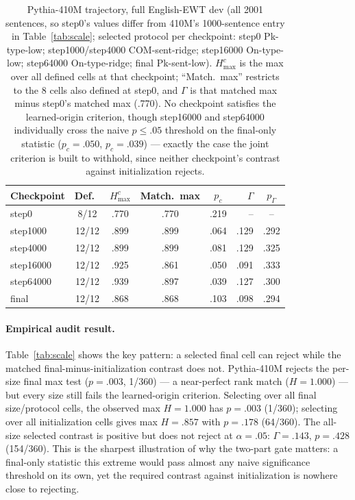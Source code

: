 \documentclass[11pt]{article}
\begin{document}
\begin{table}[t]
\centering\scriptsize
\setlength{\tabcolsep}{2pt}
\begin{tabular}{lccccrc}
\toprule
Checkpoint & Def.\ & $H^c_{\max}$ & Match.\ max & $p_c$ & $\Gamma$ & $p_\Gamma$ \\
\midrule
step0     & 8/12  & .770 & .770 & .219 & --      & -- \\
step1000  & 12/12 & .899 & .899 & .064 & .129    & .292 \\
step4000  & 12/12 & .899 & .899 & .081 & .129    & .325 \\
step16000 & 12/12 & .925 & .861 & .050 & .091    & .333 \\
step64000 & 12/12 & .939 & .897 & .039 & .127    & .300 \\
final     & 12/12 & .868 & .868 & .103 & .098    & .294 \\
\bottomrule
\end{tabular}
\caption{Pythia-410M trajectory, full English-EWT dev (all 2001 sentences, so step0's values differ from 410M's 1000-sentence entry in Table~\ref{tab:scale}; selected protocol per checkpoint: step0 Pk-type-low; step1000/step4000 COM-sent-ridge; step16000 On-type-low; step64000 On-type-ridge; final Pk-sent-low). $H^c_{\max}$ is the max over all defined cells at that checkpoint; ``Match.\ max'' restricts to the 8 cells also defined at step0, and $\Gamma$ is that matched max minus step0's matched max (.770). No checkpoint satisfies the learned-origin criterion, though step16000 and step64000 individually cross the naive $p\le.05$ threshold on the final-only statistic ($p_c=.050$, $p_c=.039$) --- exactly the case the joint criterion is built to withhold, since neither checkpoint's contrast against initialization rejects.}
\label{tab:trajectory}
\end{table}

\paragraph{Empirical audit result.} Table~\ref{tab:scale} shows the key pattern: a selected final cell can reject while the matched final-minus-initialization contrast does not. Pythia-410M rejects the per-size final max test ($p=.003$, 1/360) --- a near-perfect rank match ($H=1.000$) --- but every size still fails the learned-origin criterion. Selecting over all final size/protocol cells, the observed max $H=1.000$ has $p=.003$ (1/360); selecting over all initialization cells gives max $H=.857$ with $p=.178$ (64/360). The all-size selected contrast is positive but does not reject at $\alpha=.05$: $\Gamma=.143$, $p=.428$ (154/360). This is the sharpest illustration of why the two-part gate matters: a final-only statistic this extreme would pass almost any naive significance threshold on its own, yet the required contrast against initialization is nowhere close to rejecting.
\end{document}
